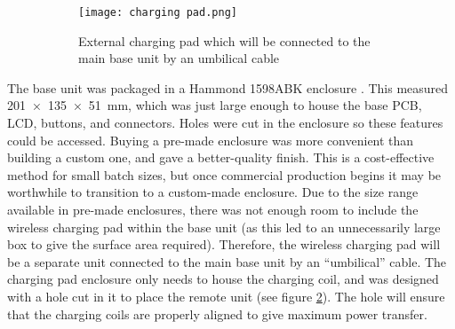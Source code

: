 \begin{figure}[htb]
	\centering
	\begin{subfigure}[b]{0.4\linewidth}
		\texttt{[image: charging pad.png]}
		\caption{External charging pad which will be connected to the main base unit by an umbilical cable}
		\label{fig: charging pad}
	\end{subfigure}
	\caption{}
\end{figure}

The base unit was packaged in a Hammond 1598ABK enclosure \cite{hammond}. This measured \SI{201x135x51}{\milli\metre}, which was just large enough to house the base PCB, LCD, buttons, and connectors. Holes were cut in the enclosure so these features could be accessed. Buying a pre-made enclosure was more convenient than building a custom one, and gave a better-quality finish. This is a cost-effective method for small batch sizes, but once commercial production begins it may be worthwhile to transition to a custom-made enclosure. Due to the size range available in pre-made enclosures, there was not enough room to include the wireless charging pad within the base unit (as this led to an unnecessarily large box to give the surface area required). Therefore, the wireless charging pad will be a separate unit connected to the main base unit by an ``umbilical'' cable. The charging pad enclosure only needs to house the charging coil, and was designed with a hole cut in it to place the remote unit (see figure \ref{fig: charging pad}). The hole will ensure that the charging coils are properly aligned to give maximum power transfer.\\

